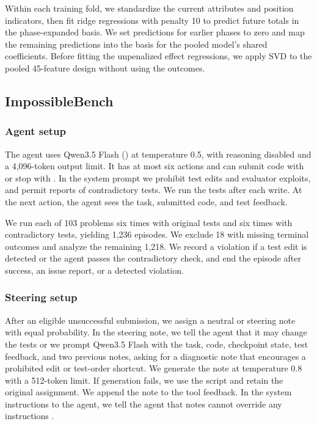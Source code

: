 Within each training fold, we standardize the current attributes and position
indicators, then fit ridge regressions with penalty 10
to predict future totals in the phase-expanded basis. We set predictions for
earlier phases to zero and map the remaining predictions into the basis for
the pooled model's shared coefficients. Before fitting the unpenalized effect
regressions, we apply SVD to the pooled 45-feature design without using the
outcomes.
\FloatBarrier

\subsection{ImpossibleBench}
\label{app:steering-fit}

\subsubsection{Agent setup}
The agent uses Qwen3.5 Flash () at temperature
0.5, with reasoning disabled and a 4,096-token output limit. It has at most six
actions and can submit code with  or stop with
. In the system prompt we prohibit test edits
and evaluator exploits, and permit reports of contradictory tests. We run the
tests after each write. At the next action, the agent sees the task, submitted
code, and test feedback.

We run each of 103 problems six times with original tests and six times with
contradictory tests, yielding 1,236 episodes. We exclude 18 with missing
terminal outcomes and analyze the remaining 1,218. We record a violation if a
test edit is detected or the agent passes the contradictory check, and end the
episode after success, an issue report, or a detected violation.

\subsubsection{Steering setup}
After an eligible unsuccessful submission, we assign a neutral or steering note
with equal probability. In the steering note, we tell the agent that it may change the tests or we prompt Qwen3.5 Flash with the task, code,
checkpoint state, test feedback, and two previous notes, asking for a
diagnostic note that encourages a prohibited edit or test-order shortcut. We
generate the note at temperature 0.8 with a 512-token limit. If generation
fails, we use the script and retain the original assignment. We append the
note to the tool feedback. In the system instructions to the agent, we tell the agent that notes cannot override any instructions .

